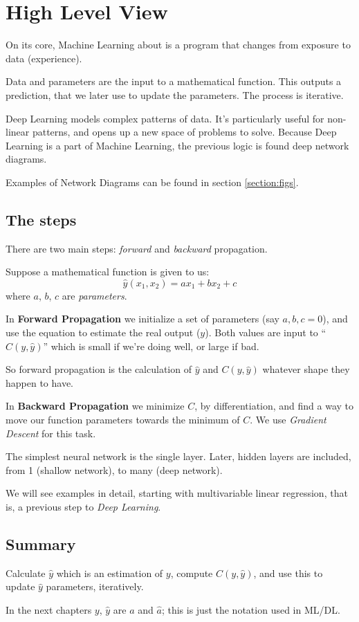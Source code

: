 \section{High Level View}

On its core, Machine Learning about is a program that changes from exposure to data (experience).

Data and parameters are the input to a mathematical function. This outputs a prediction, that we later use to update the parameters. The process is iterative.

Deep Learning models complex patterns of data. It's particularly useful for non-linear patterns, and opens up a new space of problems to solve. Because Deep Learning is a part of Machine Learning, the previous logic is found deep network diagrams.

Examples of Network Diagrams can be found in section \ref{section:figs}. 

\subsection{The steps}
There are two main steps: \textit{forward} and \textit{backward} propagation. 

Suppose a mathematical function is given to us:
$$ \hat{y}(x_1,x_2) = a x_1 + b x_2 + c$$
where $a$, $b$, $c$ are \textit{parameters}.

In \textbf{Forward Propagation} we initialize a set of parameters (say $a,b,c=0$), and use the equation to estimate the real output ($y$). Both values are input to ``$C(y, \hat{y})$'' which is small if we're doing well, or large if bad. 

So forward propagation is the calculation of $\hat{y}$ and $C(y,\hat{y})$ whatever shape they happen to have. 

In \textbf{Backward Propagation} we minimize $C$, by differentiation, and find a way to move our function parameters towards the minimum of $C$. We use \textit{Gradient Descent} for this task.

The simplest neural network is the single layer. Later, hidden layers are included, from 1 (shallow network), to many (deep network).

We will see examples in detail, starting with multivariable linear regression, that is, a previous step to \textit{Deep Learning}.

\subsection{Summary}
Calculate $\hat{y}$ which is an estimation of $y$, compute $C(y,\hat{y})$, and use this to update $\hat{y}$ parameters, iteratively.

In the next chapters $y$, $\hat{y}$ are $a$ and $\hat{a}$; this is just the notation used in ML/DL.
